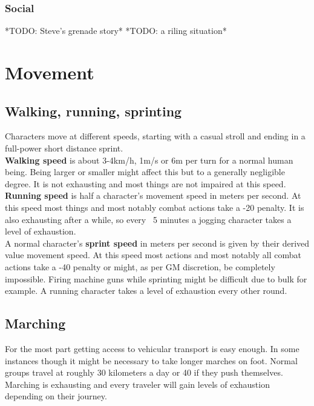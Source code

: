 \documentclass[12pt,a4paper,openany]{book}
\begin{document}
	\subsection*{Social}
	*TODO: Steve's grenade story*
	*TODO: a riling situation*
	
	\chapter{Movement}
	\section{Walking, running, sprinting}
	Characters move at different speeds, starting with a casual stroll and ending in a full-power short distance sprint.\\
	\textbf{Walking speed} is about 3-4km/h, 1m/s or 6m per turn for a normal human being. Being larger or smaller might affect this but to a generally negligible degree. It is not exhausting and most things are not impaired at this speed.\\
	\textbf{Running speed} is half a character’s movement speed in meters per second. At this speed most things and most notably combat actions take a -20 penalty. It is also exhausting after a while, so every ~5 minutes a jogging character takes a level of exhaustion.\\
	A normal character’s \textbf{sprint speed} in meters per second is given by their derived value movement speed. At this speed most actions and most notably all combat actions take a -40 penalty or might, as per GM discretion, be completely impossible. Firing machine guns while sprinting might be difficult due to bulk for example. A running character takes a level of exhaustion every other round.
	\section{Marching}
	For the most part getting access to vehicular transport is easy enough. In some instances though it might be necessary to take longer marches on foot. Normal groups travel at roughly 30 kilometers a day or 40 if they push themselves. Marching is exhausting and every traveler will gain levels of exhaustion depending on their journey.
\end{document}
